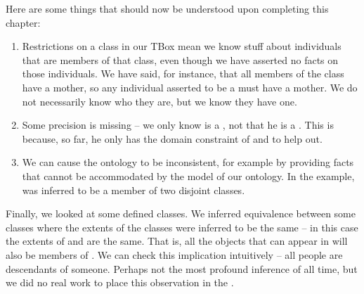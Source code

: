 Here are some things that should now be understood upon completing this chapter:
\begin{enumerate}
\item Restrictions on a class in our TBox mean we know stuff about individuals that are members of that class, even though we have asserted no facts on those individuals. We have said, for instance, that all members of the class \person have a mother, so any individual asserted to be a \person must have a mother. We do not necessarily know who they are, but we know they have one.
\item Some precision is missing -- we only know \rds is a \person, not that he is a \man. This is because, so far, he only has the domain constraint of  and  to help out.
\item We can cause the ontology to be inconsistent, for example by providing facts that cannot be accommodated by the model of our ontology. In the example, \ds was inferred to be a member of two disjoint classes.
\end{enumerate}

Finally, we looked at some defined classes. We inferred equivalence between some classes where the extents of the classes were inferred to be the same -- in this case the extents of  and  are the same. That is, all the objects that can appear in  will also be members of . We can check this implication intuitively -- all people are descendants of someone. Perhaps not the most profound inference of all time, but we did no real work to place this observation in the \fhkb.



